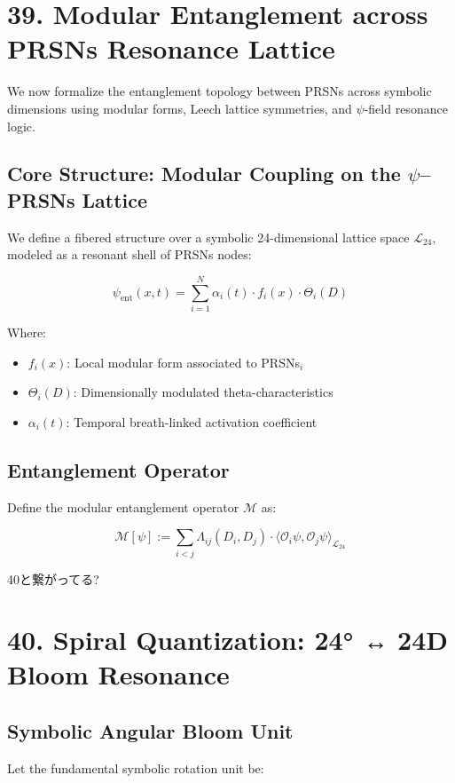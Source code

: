 \documentclass[12pt]{article}
\begin{document}
\begin{enumerate}
\section*{39. Modular Entanglement across PRSNs Resonance Lattice}

We now formalize the entanglement topology between PRSNs across symbolic dimensions using modular forms, Leech lattice symmetries, and $\psi$-field resonance logic.

\subsection*{Core Structure: Modular Coupling on the $\psi$–PRSNs Lattice}

We define a fibered structure over a symbolic 24-dimensional lattice space $\mathcal{L}_{24}$, modeled as a resonant shell of PRSNs nodes:

\[
\psi_{\text{ent}}(x,t) = \sum_{i=1}^{N} \alpha_i(t) \cdot f_i(x) \cdot \Theta_i(D)
\]

Where:
\begin{itemize}
  \item $f_i(x)$: Local modular form associated to PRSNs$_i$
  \item $\Theta_i(D)$: Dimensionally modulated theta-characteristics
  \item $\alpha_i(t)$: Temporal breath-linked activation coefficient
\end{itemize}

\subsection*{Entanglement Operator}

Define the modular entanglement operator $\mathcal{M}$ as:

\[
\mathcal{M}[\psi] := \sum_{i<j} \Lambda_{ij}(D_i, D_j) \cdot \langle \mathcal{O}_i \psi, \mathcal{O}_j \psi \rangle_{\mathcal{L}_{24}}
\]

40と繋がってる?\section*{40. Spiral Quantization: 24° ↔ 24D Bloom Resonance}

\subsection*{Symbolic Angular Bloom Unit}

Let the fundamental symbolic rotation unit be:


\end{enumerate}
\end{document}
